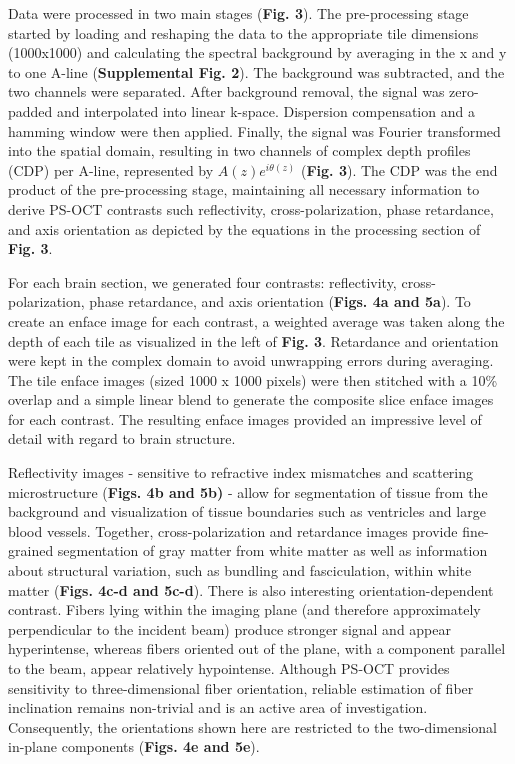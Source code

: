 \documentclass{article}
\begin{document}
Data were processed in two main stages (\textbf{Fig. 3}). The pre-processing stage started by loading and reshaping the data to the appropriate tile dimensions (1000x1000) and calculating the spectral background by averaging in the x and y to one A-line (\textbf{Supplemental Fig. 2}). The background was subtracted, and the two channels were separated. After background removal, the signal was zero-padded and interpolated into linear k-space. Dispersion compensation and a hamming window were then applied. Finally, the signal was Fourier transformed into the spatial domain, resulting in two channels of complex depth profiles (CDP) per A-line, represented by $A(z)e^{i\theta(z)}$ (\textbf{Fig. 3}). The CDP was the end product of the pre-processing stage,  maintaining all necessary information to derive PS-OCT contrasts such reflectivity, cross-polarization, phase retardance, and axis orientation as depicted by the equations in the processing section of \textbf{Fig. 3}.

For each brain section, we generated four contrasts: reflectivity, cross-polarization, phase retardance, and axis orientation (\textbf{Figs. 4a and 5a}). To create an enface image for each contrast, a weighted average was taken along the depth of each tile as visualized in the left of \textbf{Fig. 3}. Retardance and orientation were kept in the complex domain to avoid unwrapping errors during averaging. The tile enface images (sized 1000 x 1000 pixels) were then stitched with a 10\% overlap and a simple linear blend to generate the composite slice enface images for each contrast. The resulting enface images provided an impressive level of detail with regard to brain structure.

Reflectivity images - sensitive to refractive index mismatches and scattering microstructure (\textbf{Figs. 4b and 5b)} - allow for segmentation of tissue from the background and visualization of tissue boundaries such as ventricles and large blood vessels. Together, cross-polarization and retardance images provide fine-grained segmentation of gray matter from white matter as well as information about structural variation, such as bundling and fasciculation, within white matter (\textbf{Figs. 4c-d and 5c-d}). There is also interesting orientation-dependent contrast. Fibers lying within the imaging plane (and therefore approximately perpendicular to the incident beam) produce stronger signal and appear hyperintense, whereas fibers oriented out of the plane, with a component parallel to the beam, appear relatively hypointense. Although PS-OCT provides sensitivity to three-dimensional fiber orientation, reliable estimation of fiber inclination remains non-trivial and is an active area of investigation. Consequently, the orientations shown here are restricted to the two-dimensional in-plane components (\textbf{Figs. 4e and 5e}).
\end{document}
